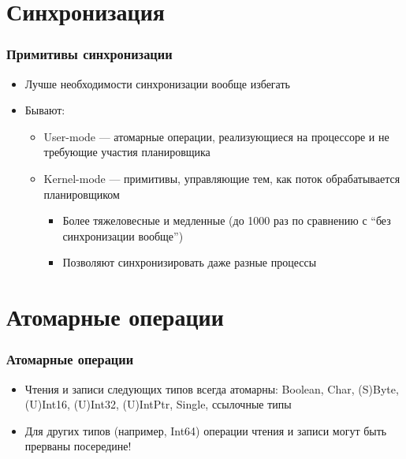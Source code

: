 \documentclass{../../slides-style}
\begin{document}
    \begin{frame}[plain]
        \titlepage
    \end{frame}

    \section{Синхронизация}

    \begin{frame}
        \frametitle{Примитивы синхронизации}
        \begin{itemize}
            \item Лучше необходимости синхронизации вообще избегать
            \item Бывают:
            \begin{itemize}
                \item User-mode --- атомарные операции, реализующиеся на процессоре и не требующие участия планировщика
                \item Kernel-mode --- примитивы, управляющие тем, как поток обрабатывается планировщиком
                \begin{itemize}
                    \item Более тяжеловесные и медленные (до 1000 раз по сравнению с ``без синхронизации вообще'')
                    \item Позволяют синхронизировать даже разные процессы
                \end{itemize}
            \end{itemize}
        \end{itemize}
    \end{frame}

    \section{Атомарные операции}

    \begin{frame}
        \frametitle{Атомарные операции}
        \begin{itemize}
            \item Чтения и записи следующих типов всегда атомарны: Boolean, Char, (S)Byte, (U)Int16, (U)Int32, (U)IntPtr, Single, ссылочные типы
            \item Для других типов (например, Int64) операции чтения и записи могут быть прерваны посередине!
        \end{itemize}
    \end{frame}
\end{document}
